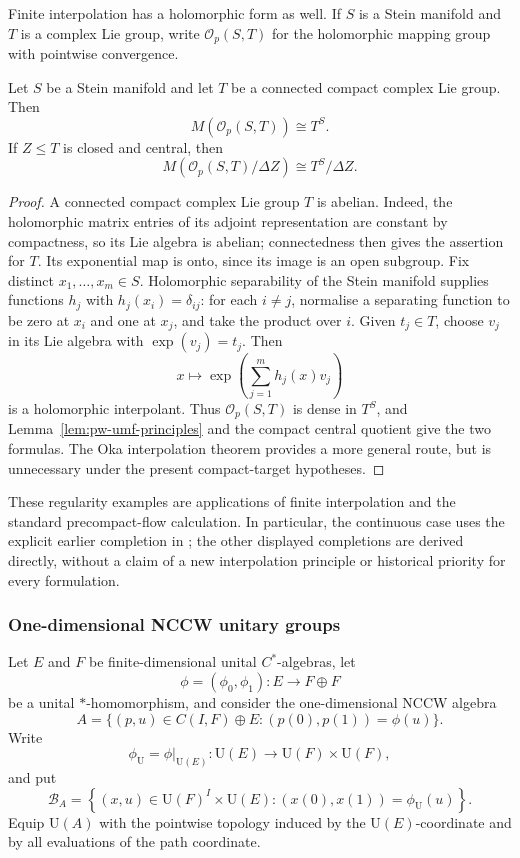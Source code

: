 Finite interpolation has a holomorphic form as well. If \(S\) is a Stein
manifold and \(T\) is a complex Lie group, write
\(\mathcal O_p(S,T)\) for the holomorphic mapping group with pointwise
convergence.

\begin{theorem}\label{thm:pw-holomorphic-mapping-umf}
Let \(S\) be a Stein manifold and let \(T\) be a connected compact complex Lie
group. Then
\[
 M(\mathcal O_p(S,T))\cong T^S.
\]
If \(Z\leq T\) is closed and central, then
\[
 M(\mathcal O_p(S,T)/\Delta Z)\cong T^S/\Delta Z.
\]
\end{theorem}

\begin{proof}
A connected compact complex Lie group \(T\) is abelian. Indeed, the
holomorphic matrix entries of its adjoint representation are constant by
compactness, so its Lie algebra is abelian; connectedness then gives the
assertion for \(T\). Its exponential map is onto, since its image is an open
subgroup. Fix distinct \(x_1,\ldots,x_m\in S\). Holomorphic separability of
the Stein manifold supplies functions \(h_j\) with
\(h_j(x_i)=\delta_{ij}\): for each \(i\ne j\), normalise a separating
function to be zero at \(x_i\) and one at \(x_j\), and take the product over
\(i\). Given \(t_j\in T\), choose \(v_j\) in its Lie algebra with
\(\exp(v_j)=t_j\). Then
\[
 x\longmapsto\exp\!\left(\sum_{j=1}^m h_j(x)v_j\right)
\]
is a holomorphic interpolant. Thus \(\mathcal O_p(S,T)\) is dense in
\(T^S\), and Lemma~\ref{lem:pw-umf-principles} and the compact central
quotient give the two formulas. The Oka interpolation theorem
\cite[Theorem~1.1]{ForstnericPrezelj2001} provides a more general route, but is unnecessary
under the present compact-target hypotheses.
\end{proof}

These regularity examples are applications of finite interpolation and the
standard precompact-flow calculation. In particular, the continuous case
uses the explicit earlier completion in \cite{ShakhmatovSpevak2010}; the other displayed
completions are derived directly, without a claim of a new interpolation
principle or historical priority for every formulation.


\subsubsection{One-dimensional NCCW unitary groups}

Let \(E\) and \(F\) be finite-dimensional unital \(C^*\)-algebras, let
\[
\phi=(\phi_0,\phi_1):E\longrightarrow F\oplus F
\]
be a unital \(*\)-homomorphism, and consider the one-dimensional NCCW algebra
\[
A=\{(p,u)\in C(I,F)\oplus E:(p(0),p(1))=\phi(u)\}.
\]
Write
\[
\phi_{\mathrm U}=\phi|_{\mathrm U(E)}:
\mathrm U(E)\longrightarrow\mathrm U(F)\times\mathrm U(F),
\]
and put
\begin{equation}\label{eq:pw-nccw-pointwise-completion}
\mathcal B_A=
\left\{(x,u)\in\mathrm U(F)^I\times\mathrm U(E):
 (x(0),x(1))=\phi_{\mathrm U}(u)\right\}.
\end{equation}
Equip \(\mathrm U(A)\) with the pointwise topology induced by the
\(\mathrm U(E)\)-coordinate and by all evaluations of the path coordinate.

